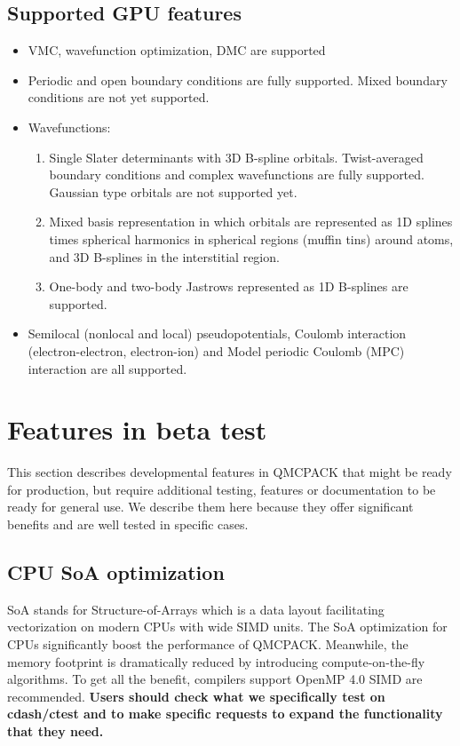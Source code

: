 \subsection{Supported GPU features}

\begin{itemize}

  \item VMC, wavefunction optimization, DMC are supported
  \item Periodic and open boundary conditions are fully supported. Mixed boundary conditions are not yet supported.
  \item Wavefunctions:
    \begin{enumerate}
        \item Single Slater determinants with 3D B-spline orbitals. Twist-averaged boundary conditions and complex wavefunctions are fully supported. Gaussian type orbitals are not supported yet.
        \item Mixed basis representation in which orbitals are represented as 1D splines times spherical harmonics in spherical regions (muffin tins) around atoms, and 3D B-splines in the interstitial region.
        \item One-body and two-body Jastrows represented as 1D B-splines are supported.
    \end{enumerate}
  \item Semilocal (nonlocal and local) pseudopotentials, Coulomb interaction (electron-electron, electron-ion) and Model periodic Coulomb (MPC) interaction are all supported.
\end{itemize}

\section{Features in beta test}
This section describes developmental features in QMCPACK that might be ready for production, but require additional testing, features or documentation to be ready for general use. We describe them here because they offer significant benefits and are well tested in specific cases.

\subsection{CPU SoA optimization}
SoA stands for Structure-of-Arrays which is a data layout facilitating vectorization on modern CPUs with wide SIMD units. The SoA optimization \cite{IPCC_SC17} for CPUs significantly boost the performance of QMCPACK. Meanwhile, the memory footprint is dramatically reduced by introducing compute-on-the-fly algorithms. To get all the benefit, compilers support OpenMP 4.0 SIMD are recommended. \textbf{Users should check what we specifically test on cdash/ctest and to make specific requests to expand the functionality that they need.}

